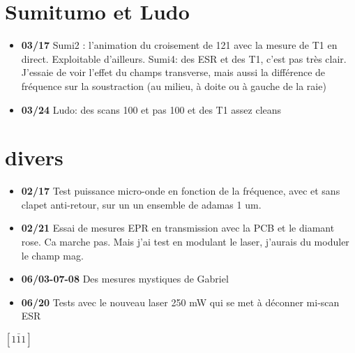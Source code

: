 \documentclass[a4paper]{article}
\begin{document}
\section{Sumitumo et Ludo}
\begin{itemize}
\item \textbf{03/17} Sumi2 : l'animation du croisement de 121 avec la mesure de T1 en direct. Exploitable d'ailleurs. Sumi4: des ESR et des T1, c'est pas très clair. J'essaie de voir l'effet du champs transverse, mais aussi la différence de fréquence sur la soustraction (au milieu, à doite ou à gauche de la raie)
\item \textbf{03/24} Ludo: des scans 100 et pas 100 et des T1 assez cleans
\end{itemize}
\section{divers}
\begin{itemize}
\item \textbf{02/17} Test puissance micro-onde en fonction de la fréquence, avec et sans clapet anti-retour, sur un un ensemble de adamas 1 um.
\item \textbf{02/21} Essai de mesures EPR en transmission avec la PCB et le diamant rose. Ca marche pas. Mais j'ai test en modulant le laser, j'aurais du moduler le champ mag.
\item \textbf{06/03-07-08} Des mesures mystiques de Gabriel
\item \textbf{06/20} Tests avec le nouveau laser 250 mW qui se met à déconner mi-scan ESR
\end{itemize}
$\left[1 \bar 1 1 \right]$
\end{document}
